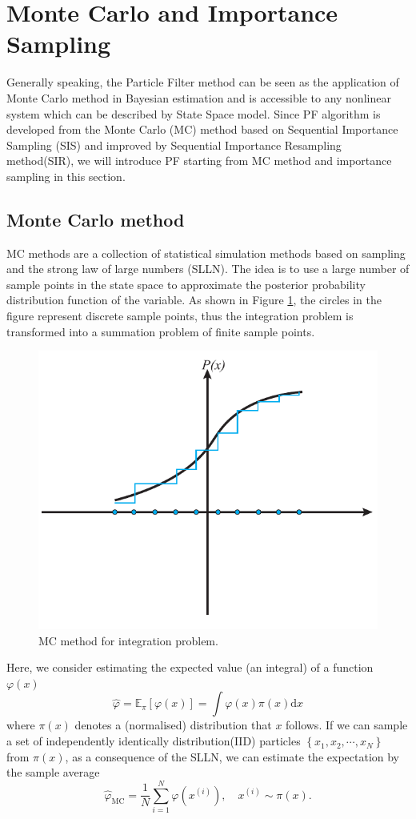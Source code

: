\documentclass[mstat,12pt]{unswthesis}  %
\numberwithin{equation}{section}
\begin{document}
\section{Monte Carlo and Importance Sampling}
\noindent Generally speaking, the Particle Filter method 
can be seen as the application of Monte Carlo method in Bayesian estimation and
is accessible to any nonlinear system which can be described by State Space model.  
Since PF algorithm is developed from the Monte Carlo (MC) method based on Sequential Importance Sampling (SIS) and improved by Sequential Importance Resampling method(SIR), we will introduce PF starting from
MC method and importance sampling in this section.\\

\subsection{Monte Carlo method}
\noindent MC methods are a collection of statistical simulation methods based on sampling
and the strong law of large numbers (SLLN).
The idea is to use a large number of sample points in the state space to approximate the posterior probability distribution function of the variable.
As shown in Figure \ref{fig:mc}, the circles in the figure represent discrete sample points, thus the integration problem is transformed into a summation problem of finite sample points.\\


\begin{figure}
    \centering
    \includegraphics[width=0.50\linewidth]{mc.pdf}
    \caption{MC method for integration problem.}
    \label{fig:mc}
\end{figure}

\noindent Here, we consider estimating
the expected value (an integral) of a function $\varphi(x)$
\begin{equation}\widehat{\varphi}=\mathbb{E}_{\pi}[\varphi(x)]=\int \varphi(x) \pi(x) \mathrm{d} x\end{equation}
where $\pi(x)$  denotes a (normalised)  distribution that
$x$ follows.
If we can sample a set of independently identically distribution(IID) particles $\left\{x_{1}, x_{2}, \cdots, x_{N}\right\}$ from $\pi(x)$, as a consequence of the SLLN,
we can estimate the
expectation by the sample average
\begin{equation}\widehat{\varphi}_{\mathrm{MC}}=\frac{1}{N} \sum_{i=1}^{N} \varphi\left(x^{(i)}\right), \quad x^{(i)} \sim \pi(x).\end{equation}\\
\end{document}
